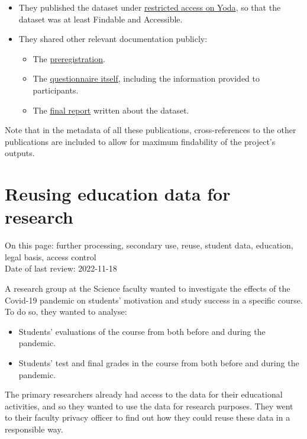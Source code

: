 \documentclass[
]{book}
\providecommand{\tightlist}{%
  \setlength{\itemsep}{0pt}\setlength{\parskip}{0pt}}
\begin{document}
\begin{itemize}
\tightlist
\item
  They published the dataset under
  \href{https://doi.org/10.24416/UU01-3L9K99}{restricted access on Yoda},
  so that the dataset was at least Findable and Accessible.
\item
  They shared other relevant documentation publicly:

  \begin{itemize}
  \tightlist
  \item
    The \href{https://doi.org/10.5281/zenodo.5727106}{preregistration}.
  \item
    The \href{https://doi.org/10.5281/zenodo.5727057}{questionnaire itself},
    including the information provided to participants.
  \item
    The \href{https://doi.org/10.5281/zenodo.5725177}{final report}
    written about the dataset.
  \end{itemize}
\end{itemize}

Note that in the metadata of all these publications, cross-references to the
other publications are included to allow for maximum findability of the
project's outputs.

\hypertarget{reuse-education-data}{%
\chapter{Reusing education data for research}\label{reuse-education-data}}

On this page: further processing, secondary use, reuse, student data, education,
legal basis, access control\\
Date of last review: 2022-11-18

A research group at the Science faculty wanted to investigate the effects of the
Covid-19 pandemic on students' motivation and study success in a specific course.
To do so, they wanted to analyse:

\begin{itemize}
\tightlist
\item
  Students' evaluations of the course from both before and during the pandemic.
\item
  Students' test and final grades in the course from both before and during the pandemic.
\end{itemize}

The primary researchers already had access to the data for their educational
activities, and so they wanted to use the data for research purposes. They went
to their faculty privacy officer to find out how they could reuse these data in
a responsible way.
\end{document}
